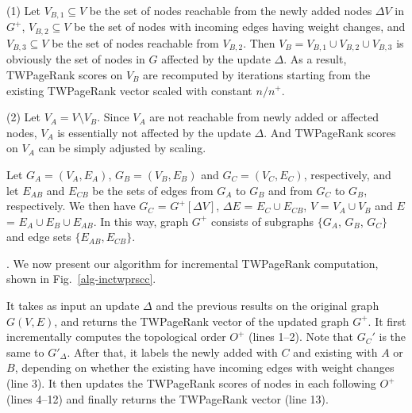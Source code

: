 \noindent(1) Let $V_{B,1}\subseteq V$ be the set of nodes reachable from the newly added nodes $\Delta V$ in $G^+$, $V_{B,2}\subseteq V$ be the set of nodes with incoming edges having weight changes, and $V_{B,3}\subseteq V$ be the set of nodes reachable from  $V_{B,2}$.
%
Then $V_B=V_{B,1}\cup V_{B,2}\cup V_{B,3}$ is obviously the set of nodes in $G$ affected by the update $\Delta$.
%
As a result, TWPageRank scores on $V_B$ are recomputed by iterations starting from the existing TWPageRank vector scaled with constant ${n}/{n^+}$.


\noindent(2) Let $V_A = V\setminus V_B$. Since $V_A$ are not reachable from newly added or affected nodes, $V_A$ is essentially not affected by the update $\Delta$. And TWPageRank scores on $V_A$ can be simply adjusted by scaling.

Let $G_A=(V_A,E_A)$, $G_B=(V_B,E_B)$ and $G_C=(V_C,E_C)$, respectively, and
let $E_{AB}$ and $E_{CB}$  be the sets of edges from $G_A$ to $G_B$ and from $G_C$ to $G_B$, respectively.
We then have $G_C$ = $G^+[\Delta V]$, $\Delta E$ = $E_C\cup E_{CB}$, $V$ = $V_A\cup V_B$ and $E$ = $E_A\cup E_B\cup E_{AB}$.
%
In this way, graph $G^+$ consists of subgraphs $\{G_A$, $G_B$, $G_C\}$ and edge sets $\{E_{AB}, E_{CB}\}$.



. We now present our algorithm for incremental TWPageRank  computation, shown in Fig.~\ref{alg-inctwprscc}.


It takes as input an update $\Delta$ and the previous results on the original graph $G(V, E)$, and returns the TWPageRank vector of the updated graph $G^+$. It first incrementally computes the topological order $O^+$
(lines 1--2). Note that $G_C'$ is the same to $G'_\Delta$.
%
After that, it labels the newly added \sccs with $C$ and existing \sccs with $A$ or $B$, depending on whether the existing \sccs have incoming edges with weight changes (line 3).
%
It then updates the TWPageRank scores of nodes in each \scc following $O^+$ (lines 4--12) and finally returns the TWPageRank vector (line 13).
%
%

